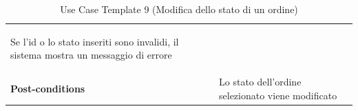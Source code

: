 \documentclass{article}
\begin{document}
\begin{table}
\begin{tabularx}{\textwidth}{|lX|}
\begin{description}[nosep,before=\leavevmode\vspace*{-1\baselineskip},after=\leavevmode\vspace*{-1\baselineskip}]
                                                                        \item [4a.] Se l'id o lo stato inseriti sono invalidi, il sistema mostra un messaggio di errore
                                                                    \end{description} \\
                    \rowcolor{white} \textbf{Post-conditions} & Lo stato dell'ordine selezionato viene modificato \\
                    \toprule
                \end{tabularx}
                \caption{Use Case Template 9 (Modifica dello stato di un ordine)}
                \label{tab:use-case-template-9}
            \end{table}
\end{document}
